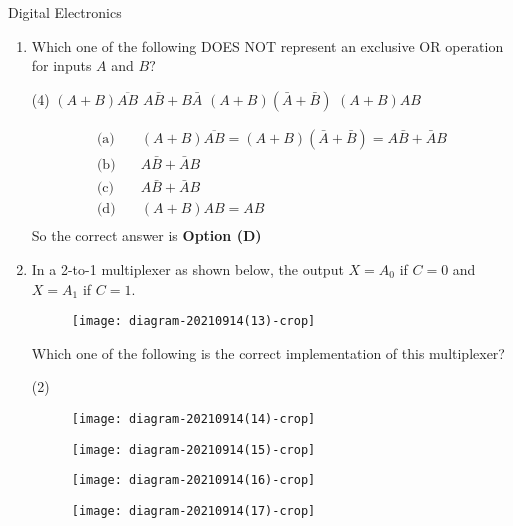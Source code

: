 \begin{abox}
	Digital Electronics
	\end{abox}
\begin{enumerate}
	\item Which one of the following DOES NOT represent an exclusive OR operation for inputs $A$ and $B ?$
\begin{tasks}(4)
\task[\textbf{A.}] $(A+B) \overline{A B}$
\task[\textbf{B.}]  $A \bar{B}+B \bar{A}$
\task[\textbf{C.}] $(A+B)(\bar{A}+\bar{B})$
\task[\textbf{D.}] $(A+B) A B$
\end{tasks}
\begin{answer}
\begin{align*}
\text{(a)}& \quad(A+B) \overline{A B}=(A+B)(\bar{A}+\bar{B})=A \bar{B}+\bar{A} B\\
\text{(b)}& \quad A \bar{B}+\bar{A} B\\
\text{(c)}& \quad A \bar{B}+\bar{A} B\\
\text{(d)}& \quad (A+B) A B=A B\\
\end{align*}
So the correct answer is \textbf{Option (D)}
\end{answer}
\item 	In a 2-to-1 multiplexer as shown below, the output $X=A_{0}$ if $C=0$ and $X=A_{1}$ if $C=1$.\\
\begin{figure}[H]
	\centering
	\texttt{[image: diagram-20210914(13)-crop]}
\end{figure}
Which one of the following is the correct implementation of this multiplexer?
\begin{tasks}(2)
\task[\textbf{A.}] \begin{figure}[H]
	\centering
	\texttt{[image: diagram-20210914(14)-crop]}
\end{figure}
\task[\textbf{B.}] \begin{figure}[H]
	\centering
	\texttt{[image: diagram-20210914(15)-crop]}
\end{figure}
\task[\textbf{C.}]\begin{figure}[H]
	\centering
	\texttt{[image: diagram-20210914(16)-crop]}
\end{figure}
\task[\textbf{D.}] \begin{figure}[H]
	\centering
	\texttt{[image: diagram-20210914(17)-crop]}
\end{figure}
\end{tasks}

\end{enumerate}
